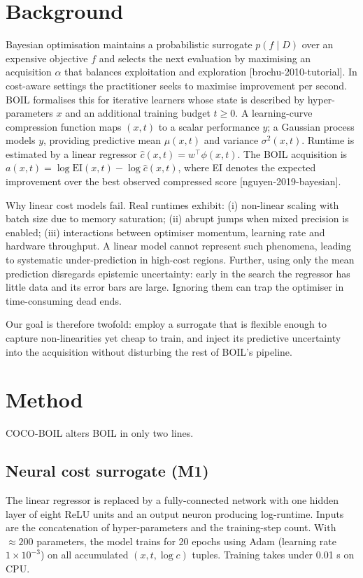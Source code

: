 \documentclass{article}
\begin{document}
\section{Background}
Bayesian optimisation maintains a probabilistic surrogate $p(f\mid D)$ over an expensive objective $f$ and selects the next evaluation by maximising an acquisition $\alpha$ that balances exploitation and exploration [brochu-2010-tutorial]. In cost-aware settings the practitioner seeks to maximise improvement per second. BOIL formalises this for iterative learners whose state is described by hyper-parameters $x$ and an additional training budget $t\ge 0$. A learning-curve compression function maps $(x,t)$ to a scalar performance $y$; a Gaussian process models $y$, providing predictive mean $\mu(x,t)$ and variance $\sigma^2(x,t)$. Runtime is estimated by a linear regressor $\hat{c}(x,t)=w^\top\phi(x,t)$. The BOIL acquisition is $a(x,t)=\log \mathrm{EI}(x,t) - \log \hat{c}(x,t)$, where EI denotes the expected improvement over the best observed compressed score [nguyen-2019-bayesian].

Why linear cost models fail. Real runtimes exhibit: (i) non-linear scaling with batch size due to memory saturation; (ii) abrupt jumps when mixed precision is enabled; (iii) interactions between optimiser momentum, learning rate and hardware throughput. A linear model cannot represent such phenomena, leading to systematic under-prediction in high-cost regions. Further, using only the mean prediction disregards epistemic uncertainty: early in the search the regressor has little data and its error bars are large. Ignoring them can trap the optimiser in time-consuming dead ends.

Our goal is therefore twofold: employ a surrogate that is flexible enough to capture non-linearities yet cheap to train, and inject its predictive uncertainty into the acquisition without disturbing the rest of BOIL's pipeline.

\section{Method}
COCO-BOIL alters BOIL in only two lines.

\subsection{Neural cost surrogate (M1)}
The linear regressor is replaced by a fully-connected network with one hidden layer of eight ReLU units and an output neuron producing log-runtime. Inputs are the concatenation of hyper-parameters and the training-step count. With $\approx 200$ parameters, the model trains for 20 epochs using Adam (learning rate $1\times 10^{-3}$) on all accumulated $(x,t, \log c)$ tuples. Training takes under 0.01 s on CPU.
\end{document}
